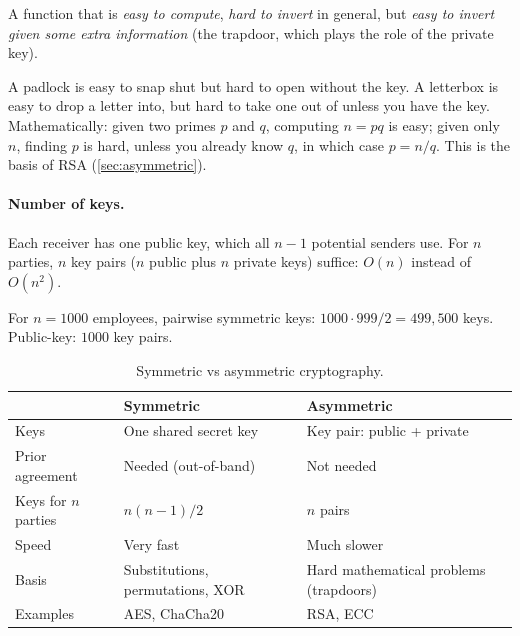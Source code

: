 \begin{definition}
A function that is \emph{easy to compute}, \emph{hard to invert} in general, but \emph{easy to invert given some extra information} (the trapdoor, which plays the role of the private key).
\end{definition}

\begin{example}
A padlock is easy to snap shut but hard to open without the key. A letterbox is easy to drop a letter into, but hard to take one out of unless you have the key. Mathematically: given two primes $p$ and $q$, computing $n = pq$ is easy; given only $n$, finding $p$ is hard, unless you already know $q$, in which case $p = n/q$. This is the basis of RSA (\cref{sec:asymmetric}).
\end{example}

\paragraph{Number of keys.} Each receiver has one public key, which all $n-1$ potential senders use. For $n$ parties, $n$ key pairs ($n$ public plus $n$ private keys) suffice: $O(n)$ instead of $O(n^2)$.

\begin{example}
For $n = 1000$ employees, pairwise symmetric keys: $1000 \cdot 999 / 2 = 499{,}500$ keys. Public-key: $1000$ key pairs.
\end{example}

\begin{table}[H]
\centering
\caption{Symmetric vs asymmetric cryptography.}
\label{tab:sym-vs-asym}
\begin{tabularx}{\textwidth}{@{}l X X@{}}
\toprule
 & Symmetric & Asymmetric \\
\midrule
Keys & One shared secret key & Key pair: public + private \\
Prior agreement & Needed (out-of-band) & Not needed \\
Keys for $n$ parties & $n(n-1)/2$ & $n$ pairs \\
Speed & Very fast & Much slower \\
Basis & Substitutions, permutations, XOR & Hard mathematical problems (trapdoors) \\
Examples & AES, ChaCha20 & RSA, ECC \\
\bottomrule
\end{tabularx}
\end{table}

